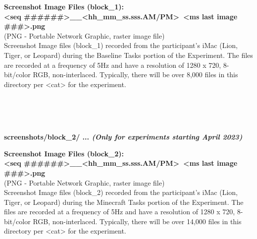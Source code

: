 \begin{description}
\begin{addmargin}[0em]{0em}
    \begin{addmargin}[1em]{0em} %
        \textbf{Screenshot Image Files (block\_1):\\<seq \#\#\#\#\#\#>\_<yyyy-mm-dd>\_<hh\_mm\_ss.sss.AM/PM>~<ms last image \#\#\#>.png}\\
        (PNG - Portable Network Graphic, raster image file)\\
        Screenshot Image files (block\_1) recorded from the participant's iMac (Lion, Tiger, or Leopard)
        during the Baseline Tasks portion of the Experiment.
        The files are recorded at a frequency of 5Hz and have a resolution of 1280 x 720, 8-bit/color RGB, non-interlaced.
        Typically, there will be over 8,000 files in this directory per <cat> for the experiment. 
    \end{addmargin} %

\end{addmargin} %


\textbf{\\\\\\}
\begin{addmargin}[0em]{0em} %
    \textbf{screenshots/block\_2/ ... \textit{(Only for experiments starting April 2023)}}

    \begin{addmargin}[1em]{0em} %
        \textbf{Screenshot Image Files (block\_2):\\<seq \#\#\#\#\#\#>\_<yyyy-mm-dd>\_<hh\_mm\_ss.sss.AM/PM>~<ms last image \#\#\#>.png}\\
        (PNG - Portable Network Graphic, raster image file)\\
        Screenshot Image files (block\_2) recorded from the participant's iMac (Lion, Tiger, or Leopard)
        during the Minecraft Tasks portion of the Experiment.
        The files are recorded at a frequency of 5Hz and have a resolution of 1280 x 720, 8-bit/color RGB, non-interlaced.
        Typically, there will be over 14,000 files in this directory per <cat> for the experiment. 
    \end{addmargin} %


\end{addmargin}
\end{description}
